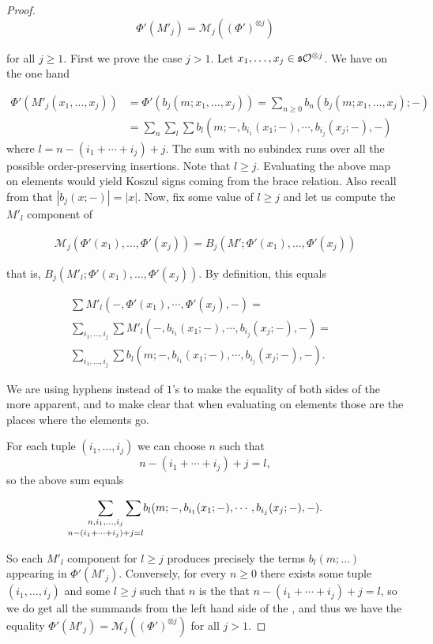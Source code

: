 \documentclass[Thesis.tex]{subfiles}
\begin{document}
\begin{proof}
\begin{equation}\label{commutative}
\Phi'(M'_j)=\mathcal{M}_j((\Phi')^{\otimes j})
\end{equation}

for all $j\geq 1$. First we prove the case $j>1$. Let $x_1,\dots, x_j\in \mathfrak{s}{\mathcal O}^{\otimes j}$. We have on the one hand


\begin{align*}
\Phi'(M'_j(x_1,\dots, x_j))& = \Phi'(b_j(m;x_1,\dots, x_j))=\sum_{n\geq 0} b_n(b_j(m;x_1,\dots, x_j);-)\\
&=\sum_n\sum_l\sum b_l(m; -, b_{i_1}(x_1;-),\cdots,b_{i_j}(x_j;-),-)
\end{align*}
where $l=n-(i_1+\cdots+i_j)+j$. The sum with no subindex runs over all the possible order-preserving insertions. Note that $l\geq j$. Evaluating the above map on elements would yield Koszul signs coming from the brace relation. Also recall from  that $|b_j(x;-)|=|x|$. Now, fix some value of $l\geq j$ and let us compute the $M'_l$ component of

\begin{align*}
\mathcal{M}_j(\Phi'(x_1),\dots, \Phi'(x_j))=B_j(M';\Phi'(x_1),\dots, \Phi'(x_j))
\end{align*}

that is, $B_j(M'_l;\Phi'(x_1),\dots, \Phi'(x_j))$. By definition, this equals

\begin{align*}
\sum M'_l(-,\Phi'(x_1),\cdots, \Phi'(x_j),-)=&\\
\sum_{i_1,\dots, i_j}\sum M'_l(-,b_{i_1}(x_1;-),\cdots,b_{i_j}(x_j;-),-)=\\
\sum_{i_1,\dots, i_j}\sum b_l(m;-,b_{i_1}(x_1;-),\cdots,b_{i_j}(x_j;-),-).
\end{align*}

We are using hyphens instead of $1$'s to make the equality of both sides of the  more apparent, and to make clear that when evaluating on elements those are the places where the elements go. %

For each tuple $(i_1,\dots, i_j)$ we can choose $n$ such that \[n-(i_1+\cdots+i_j)+j=l,\] so the above sum equals

\[\underset{\mathclap{n-(i_1+\cdots+i_j)+j=l}}{\sum_{n,i_1,\dots, i_j}}\sum b_l(m;-,b_{i_1}(x_1;-),\cdots,b_{i_j}(x_j;-),-).\]

So each $M'_l$ component for $l\geq j$ produces precisely the terms $b_l(m;\dots)$ appearing in $\Phi'(M'_j)$. Conversely, for every $n\geq 0$ there exists some tuple $(i_1,\dots, i_j)$ and some $l\geq j$ such that $n$ is the that $n-(i_1+\cdots+i_j)+j=l$, so we do get all the summands from the left hand side of the , and thus we have the equality $\Phi'(M'_j)=\mathcal{M}_j((\Phi')^{\otimes j})$ for all $j>1$.


\end{proof}
\end{document}
